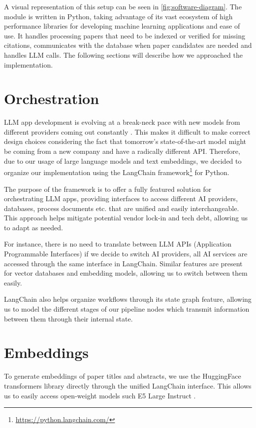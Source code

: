 \documentclass[12pt,a4paper]{report}
\begin{document}
A visual representation of this setup can be seen in \autoref{fig:software-diagram}. The module is written in Python, taking advantage of its vast ecosystem of high performance libraries for developing machine learning applications and ease of use. It handles processing papers that need to be indexed or verified for missing citations, communicates with the database when paper candidates are needed and handles LLM calls. The following sections will describe how we approached the implementation.

\section{Orchestration}

LLM app development is evolving at a break-neck pace with new models from different providers coming out constantly \cite{DeepSeekAI2024DeepSeekV3TR, Achiam2023GPT4TR, gemini-flash-2}. This makes it difficult to make correct design choices considering the fact that tomorrow's state-of-the-art model might be coming from a new company and have a radically different API. Therefore, due to our usage of large language models and text embeddings, we decided to organize our implementation using the LangChain framework\footnote{\url{https://python.langchain.com/}} for Python.

The purpose of the framework is to offer a fully featured solution for orchestrating LLM apps, providing interfaces to access different AI providers, databases, process documents etc. that are unified and easily interchangeable. This approach helps mitigate potential vendor lock-in and tech debt, allowing us to adapt as needed.

For instance, there is no need to translate between LLM APIs (Application Programmable Interfaces) if we decide to switch AI providers, all AI services are accessed through the same interface in LangChain. Similar features are present for vector databases and embedding models, allowing us to switch between them easily.

LangChain also helps organize workflows through its state graph feature, allowing us to model the different stages of our pipeline nodes which transmit information between them through their internal state. 

\section{Embeddings}

To generate embeddings of paper titles and abstracts, we use the HuggingFace transformers library \cite{Wolf2019HuggingFacesTS} directly through the unified LangChain interface. This allows us to easily access open-weight models such E5 Large Instruct \cite{Wang2024MultilingualET}.
\end{document}
